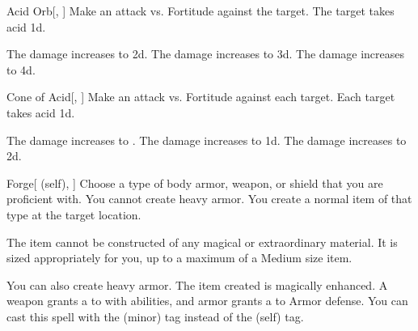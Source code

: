 \lowercase{\hypertarget{spell:Acid Orb}{}}\label{spell:Acid Orb}
\begin{freeability}[Rank 1]{\hypertarget{spell:Acid Orb}{Acid Orb}}[, ]
Make an attack vs. Fortitude against the target.
\hit The target takes acid  \plus1d.

\rankline
{} The damage increases to  \plus2d.
 The damage increases to  \plus3d.
 The damage increases to  \plus4d.
\end{freeability}
\vspace{0.25em}



\lowercase{\hypertarget{spell:Cone of Acid}{}}\label{spell:Cone of Acid}
\begin{freeability}[Rank 1]{\hypertarget{spell:Cone of Acid}{Cone of Acid}}[, ]
Make an attack vs. Fortitude against each target.
\hit Each target takes acid  \minus1d.

\rankline
{} The damage increases to .
 The damage increases to  \plus1d.
 The damage increases to  \plus2d.
\end{freeability}
\vspace{0.25em}



\lowercase{\hypertarget{spell:Forge}{}}\label{spell:Forge}
\begin{attuneability}[Rank 1]{\hypertarget{spell:Forge}{Forge}}[ (self), ]
Choose a type of body armor, weapon, or shield that you are proficient with.
You cannot create heavy armor.
You create a normal item of that type at the target location.

The item cannot be constructed of any magical or extraordinary material.
It is sized appropriately for you, up to a maximum of a Medium size item.

\rankline
{} You can also create heavy armor.
 The item created is magically enhanced.
A weapon grants a   to  with  abilities,
and armor grants a   to Armor defense.
 You can cast this spell with the  (minor) tag instead of the  (self) tag.
\end{attuneability}
\vspace{0.25em}



